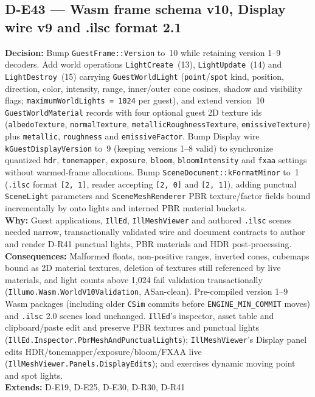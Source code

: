 \subsection*{D-E43 --- Wasm frame schema v10, Display wire v9 and .ilsc format 2.1}
\begin{decisionbox}[title={D-E43 \quad 2026-11-19}]
\textbf{Decision:} Bump \texttt{GuestFrame::Version} to~10 while retaining
version 1--9 decoders. Add world operations \texttt{LightCreate}~(13),
\texttt{LightUpdate}~(14) and \texttt{LightDestroy}~(15) carrying
\texttt{GuestWorldLight} (\texttt{point}/\texttt{spot} kind, position,
direction, color, intensity, range, inner/outer cone cosines, shadow and
visibility flags; \texttt{maximumWorldLights = 1024} per guest), and extend
version~10 \texttt{GuestWorldMaterial} records with four optional guest 2D
texture ids (\texttt{albedoTexture}, \texttt{normalTexture},
\texttt{metallicRoughnessTexture}, \texttt{emissiveTexture}) plus
\texttt{metallic}, \texttt{roughness} and \texttt{emissiveFactor}. Bump
Display wire \texttt{kGuestDisplayVersion} to~9 (keeping versions 1--8 valid)
to synchronize quantized \texttt{hdr}, \texttt{tonemapper}, \texttt{exposure},
\texttt{bloom}, \texttt{bloomIntensity} and \texttt{fxaa} settings without
warmed-frame allocations. Bump \texttt{SceneDocument::kFormatMinor} to~1
(\texttt{.ilsc} format \texttt{[2, 1]}, reader accepting \texttt{[2, 0]} and
\texttt{[2, 1]}), adding punctual \texttt{SceneLight} parameters and
\texttt{SceneMeshRenderer} PBR texture/factor fields bound incrementally by
 onto  lights and interned PBR
material buckets.\\
\textbf{Why:} Guest applications, \texttt{IllEd}, \texttt{IllMeshViewer} and
authored \texttt{.ilsc} scenes needed narrow, transactionally validated wire
and document contracts to author and render D-R41 punctual lights, PBR
materials and HDR post-processing.\\
\textbf{Consequences:} Malformed floats, non-positive ranges, inverted cones,
cubemaps bound as 2D material textures, deletion of textures still referenced
by live materials, and light counts above 1,024 fail validation transactionally
(\texttt{Illumo.Wasm.WorldV10Validation}, ASan-clean). Pre-compiled version
1--9 Wasm packages (including older \texttt{CSim} commits before
\texttt{ENGINE\_MIN\_COMMIT} moves) and \texttt{.ilsc} 2.0 scenes load
unchanged. \texttt{IllEd}'s inspector, asset table and clipboard/paste edit and
preserve PBR textures and punctual lights
(\texttt{IllEd.Inspector.PbrMeshAndPunctualLights}); \texttt{IllMeshViewer}'s
Display panel edits HDR/tonemapper/exposure/bloom/FXAA live
(\texttt{IllMeshViewer.Panels.DisplayEdits}); and
 exercises dynamic moving point and spot
lights.\\
\textbf{Extends:} D-E19, D-E25, D-E30, D-R30, D-R41
\end{decisionbox}

